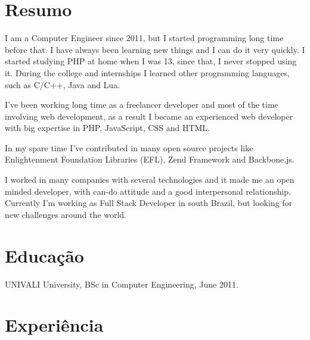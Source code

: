 \documentclass[margin]{res}
\begin{document}
  

\address{Florianopolis, BR \\ guilherme@giox.com.br \\ Phone: +55 (48) 9640-3883 }
                           
                        
\begin{resume}                        
 
\section{Resumo}   
I am a Computer Engineer since 2011, but I started programming long time before that. I have always been learning new things and I can do it very quickly. I started studying PHP at home when I was 13, since that, I never stopped using it. During the college and internships I learned other programming languages, such as C/C++, Java and Lua.

I’ve been working long time as a freelancer developer and most of the time involving web development, as a result I became an experienced web developer with big expertise in PHP, JavaScript, CSS and HTML.

In my spare time I’ve contributed in many open source projects like Enlightenment Foundation Libraries (EFL), Zend Framework and Backbone.js.

I worked in many companies with several technologies and it made me an open minded developer, with can-do attitude and a good interpersonal relationship. Currently I’m working as Full Stack Developer in south Brazil, but looking for new challenges around the world.
 
\section{Educação} UNIVALI University, BSc in Computer Engineering, June 2011.
  
\section{Experiência}


\end{resume}
\end{document}
